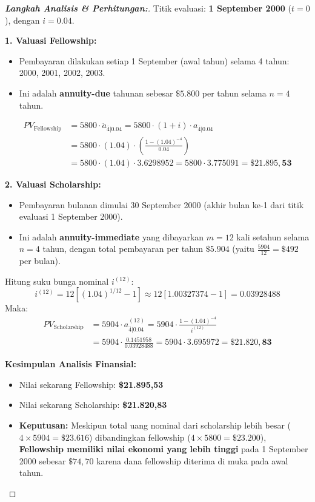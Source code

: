\documentclass[11pt,a4paper]{article}
\begin{document}
\begin{proof}[\textbf{Langkah Analisis \& Perhitungan:}]
Titik evaluasi: \textbf{1 September 2000} ($t = 0$), dengan $i = 0.04$.

\textbf{1. Valuasi Fellowship:}
\begin{itemize}
    \item Pembayaran dilakukan setiap 1 September (awal tahun) selama 4 tahun: 2000, 2001, 2002, 2003.
    \item Ini adalah \textbf{annuity-due} tahunan sebesar $\$5.800$ per tahun selama $n = 4$ tahun.
\end{itemize}
\begin{align*}
    PV_{\text{Fellowship}} &= 5800 \cdot \ddot{a}_{\overline{4}|0.04} = 5800 \cdot (1+i) \cdot a_{\overline{4}|0.04} \\
    &= 5800 \cdot (1.04) \cdot \left( \frac{1 - (1.04)^{-4}}{0.04} \right) \\
    &= 5800 \cdot (1.04) \cdot 3.6298952 = 5800 \cdot 3.775091 = \mathbf{\$21.895,53}
\end{align*}

\textbf{2. Valuasi Scholarship:}
\begin{itemize}
    \item Pembayaran bulanan dimulai 30 September 2000 (akhir bulan ke-1 dari titik evaluasi 1 September 2000).
    \item Ini adalah \textbf{annuity-immediate} yang dibayarkan $m=12$ kali setahun selama $n=4$ tahun, dengan total pembayaran per tahun $\$5.904$ (yaitu $\frac{5904}{12} = \$492$ per bulan).
\end{itemize}
Hitung suku bunga nominal $i^{(12)}$:
\begin{equation*}
    i^{(12)} = 12 \left[ (1.04)^{1/12} - 1 \right] \approx 12 [1.00327374 - 1] = 0.03928488
\end{equation*}
Maka:
\begin{align*}
    PV_{\text{Scholarship}} &= 5904 \cdot a_{\overline{4}|0.04}^{(12)} = 5904 \cdot \frac{1 - (1.04)^{-4}}{i^{(12)}} \\
    &= 5904 \cdot \frac{0.1451958}{0.03928488} = 5904 \cdot 3.695972 = \mathbf{\$21.820,83}
\end{align*}

\textbf{Kesimpulan Analisis Finansial:}
\begin{itemize}
    \item Nilai sekarang Fellowship: \textbf{\$21.895,53}
    \item Nilai sekarang Scholarship: \textbf{\$21.820,83}
    \item \textbf{Keputusan:} Meskipun total uang nominal dari scholarship lebih besar ($4 \times 5904 = \$23.616$) dibandingkan fellowship ($4 \times 5800 = \$23.200$), \textbf{Fellowship memiliki nilai ekonomi yang lebih tinggi} pada 1 September 2000 sebesar $\$74,70$ karena dana fellowship diterima di muka pada awal tahun.
\end{itemize}
\end{proof}
\end{document}
